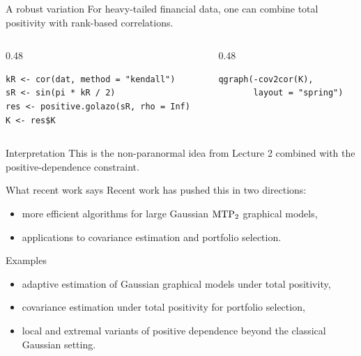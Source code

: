 \documentclass[dvipsnames,aspectratio=169,handout]{beamer}
\begin{document}
\begin{frame}[fragile]{A robust variation}
For heavy-tailed financial data, one can combine total positivity with rank-based correlations.

\begin{columns}[T,onlytextwidth]
\begin{column}{0.48\textwidth}
\begin{lstlisting}
kR <- cor(dat, method = "kendall")
sR <- sin(pi * kR / 2)
res <- positive.golazo(sR, rho = Inf)
K <- res$K
\end{lstlisting}
\end{column}
\begin{column}{0.48\textwidth}
\begin{lstlisting}
qgraph(-cov2cor(K),
       layout = "spring")
\end{lstlisting}
\end{column}
\end{columns}

\begin{alertblock}{Interpretation}
This is the non-paranormal idea from Lecture 2 combined with the positive-dependence constraint.
\end{alertblock}
\end{frame}

\begin{frame}{What recent work says}
Recent work has pushed this in two directions:
\begin{itemize}
    \item more efficient algorithms for large Gaussian ${\rm MTP}_{2}$ graphical models,
    \item applications to covariance estimation and portfolio selection.
\end{itemize}

\begin{block}{Examples}
\begin{itemize}
    \item adaptive estimation of Gaussian graphical models under total positivity,
    \item covariance estimation under total positivity for portfolio selection,
    \item local and extremal variants of positive dependence beyond the classical Gaussian setting.
\end{itemize}
\end{block}
\end{frame}

\end{document}
